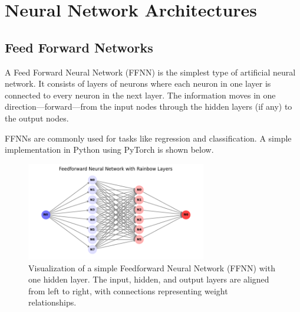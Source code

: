 \chapter{Neural Network Architectures}

%
\section{Feed Forward Networks}
A Feed Forward Neural Network (FFNN) is the simplest type of artificial neural network. It consists of layers of neurons where each neuron in one layer is connected to every neuron in the next layer. The information moves in one direction—forward—from the input nodes through the hidden layers (if any) to the output nodes.

FFNNs are commonly used for tasks like regression and classification. A simple implementation in Python using PyTorch is shown below.

\begin{figure}[ht]
    \centering
    \includegraphics[width=0.7\textwidth]{images/feed_forward_network.png}
    \caption{Visualization of a simple Feedforward Neural Network (FFNN) with one hidden layer. The input, hidden, and output layers are aligned from left to right, with connections representing weight relationships.}
    \label{fig:feed_forward_network}
\end{figure}

